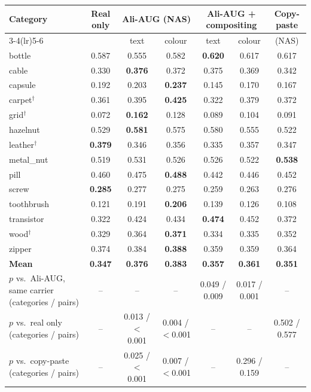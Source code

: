 \begin{tabular}{@{}l c c c c c c@{}}
\toprule
Category & Real only & \multicolumn{2}{c}{Ali-AUG (NAS)} & \multicolumn{2}{c}{Ali-AUG + compositing} & Copy-paste \\
\cmidrule(lr){3-4}\cmidrule(lr){5-6}
 & & text & colour & text & colour & (NAS) \\
\midrule
bottle & 0.587 & 0.555 & 0.582 & \textbf{0.620} & 0.617 & 0.617 \\
cable & 0.330 & \textbf{0.376} & 0.372 & 0.375 & 0.369 & 0.342 \\
capsule & 0.192 & 0.203 & \textbf{0.237} & 0.145 & 0.170 & 0.167 \\
carpet$^\dagger$ & 0.361 & 0.395 & \textbf{0.425} & 0.322 & 0.379 & 0.372 \\
grid$^\dagger$ & 0.072 & \textbf{0.162} & 0.128 & 0.089 & 0.104 & 0.091 \\
hazelnut & 0.529 & \textbf{0.581} & 0.575 & 0.580 & 0.555 & 0.522 \\
leather$^\dagger$ & \textbf{0.379} & 0.346 & 0.356 & 0.335 & 0.357 & 0.347 \\
metal\_nut & 0.519 & 0.531 & 0.526 & 0.526 & 0.522 & \textbf{0.538} \\
pill & 0.460 & 0.475 & \textbf{0.488} & 0.442 & 0.446 & 0.452 \\
screw & \textbf{0.285} & 0.277 & 0.275 & 0.259 & 0.263 & 0.276 \\
toothbrush & 0.121 & 0.191 & \textbf{0.206} & 0.139 & 0.126 & 0.108 \\
transistor & 0.322 & 0.424 & 0.434 & \textbf{0.474} & 0.452 & 0.372 \\
wood$^\dagger$ & 0.329 & 0.364 & \textbf{0.371} & 0.334 & 0.335 & 0.352 \\
zipper & 0.374 & 0.384 & \textbf{0.388} & 0.359 & 0.359 & 0.364 \\
\midrule
\textbf{Mean} & \textbf{0.347} & \textbf{0.376} & \textbf{0.383} & \textbf{0.357} & \textbf{0.361} & \textbf{0.351} \\
$p$ vs.\ Ali-AUG, same carrier (categories / pairs) & -- & -- & -- & 0.049 / 0.009 & 0.017 / 0.001 & -- \\
$p$ vs.\ real only (categories / pairs) & -- & 0.013 / $<$0.001 & 0.004 / $<$0.001 & -- & -- & 0.502 / 0.577 \\
$p$ vs.\ copy-paste (categories / pairs) & -- & 0.025 / $<$0.001 & 0.007 / $<$0.001 & -- & 0.296 / 0.159 & -- \\
\bottomrule
\end{tabular}
